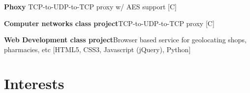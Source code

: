 \documentclass[11pt,a4paper,sans]{moderncv} %
\begin{document}
 {\textbf{Phoxy} \newline TCP-to-UDP-to-TCP proxy w/ AES support [C]}

 {\textbf{Computer networks class project}\newline TCP-to-UDP-to-TCP proxy [C]}

 {\textbf{Web Development class project}\newline Browser based service for geolocating shops, pharmacies, etc [HTML5, CSS3, Javascript (jQuery), Python]}







\section{Interests}

\renewcommand{\listitemsymbol}{-~} %





\end{document}
